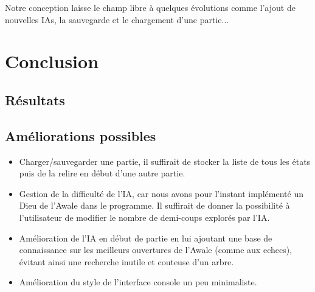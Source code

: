 \documentclass[]{article}
\begin{document}
	
Notre conception laisse le champ libre à quelques évolutions comme l'ajout de nouvelles IAs, la sauvegarde et le chargement d'une partie... 

\section{Conclusion}

\subsection{Résultats}


\subsection{Améliorations possibles}

\begin{itemize}
\item Charger/sauvegarder une partie, il suffirait de stocker la liste de tous les états puis de la relire en début d'une autre partie.
\item Gestion de la difficulté de l'IA, car nous avons pour l'instant implémenté un Dieu de l'Awale dans le programme. Il suffirait de donner la possibilité à l'utilisateur de modifier le nombre de demi-coups explorés par l'IA.
\item Amélioration de l'IA en début de partie en lui ajoutant une base de connaissance sur les meilleurs ouvertures de l'Awale (comme aux echecs), évitant ainsi une recherche inutile et couteuse d'un arbre.
\item Amélioration du style de l'interface console un peu minimaliste.
\end{itemize}
\end{document}
